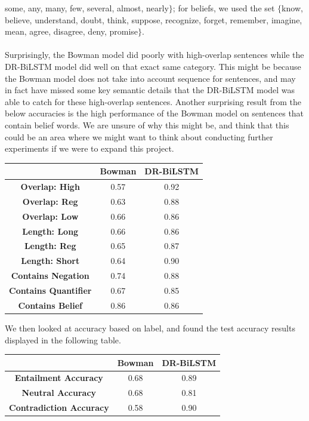 \documentclass[12pt,letterpaper]{article}
\begin{document}
some, any, many, few, several, almost, nearly$\}$; for beliefs, we used the set $\{$know, believe,
understand, doubt, think, suppose, recognize,
forget, remember, imagine, mean, agree, disagree, deny, promise$\}$. \\ \\
Surprisingly, the Bowman model did poorly with high-overlap sentences while the DR-BiLSTM model did well on that exact same category. This might be because the Bowman model does not take into account sequence for sentences, and may in fact have missed some key semantic details that the DR-BiLSTM model was able to catch for these high-overlap sentences. Another surprising result from the below accuracies is the high performance of the Bowman model on sentences that contain belief words. We are unsure of why this might be, and think that this could be an area where we might want to think about conducting further experiments if we were to expand this project. 
\begin{center}
    \begin{tabular}{| c | c | c |} \hline
         &  \textbf{Bowman} & \textbf{DR-BiLSTM} \\
         \hline
        \textbf{Overlap: High} & 0.57 & 0.92 \\ 
        \hline
        \textbf{Overlap: Reg} & 0.63 & 0.88 \\
        \hline
        \textbf{Overlap: Low} & 0.66 & 0.86 \\
        \hline
        \textbf{Length: Long} & 0.66 & 0.86 \\
        \hline
        \textbf{Length: Reg} & 0.65 & 0.87 \\
        \hline
        \textbf{Length: Short} & 0.64 & 0.90 \\
        \hline
        \textbf{Contains Negation} & 0.74 & 0.88 \\
        \hline
        \textbf{Contains Quantifier} & 0.67 & 0.85 \\
        \hline
        \textbf{Contains Belief} & 0.86 & 0.86 \\
        \hline
    \end{tabular}
\end{center}
We then looked at accuracy based on label, and found the test accuracy results displayed in the following table. 
\begin{center}
    \begin{tabular}{|c|c|c|} \hline
         &  \textbf{Bowman} & \textbf{DR-BiLSTM}\\
         \hline
        \textbf{Entailment Accuracy} & 0.68 & 0.89 \\
        \hline
        \textbf{Neutral Accuracy} & 0.68 & 0.81 \\
        \hline
        \textbf{Contradiction Accuracy} & 0.58 & 0.90 \\
        \hline
    \end{tabular}
\end{center}
\end{document}
